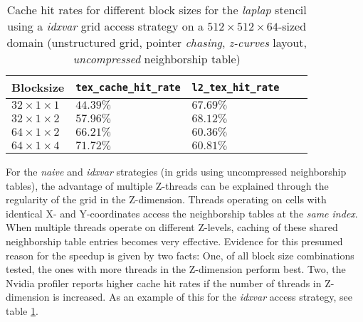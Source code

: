 \begin{table}
	\begin{center}
    \begin{tabular}{l l l p{2cm} p{2cm}}
        \hline
        \textbf{Blocksize} & \textbf{\texttt{tex\_\allowbreak cache\_\allowbreak hit\_\allowbreak rate}} & \textbf{\texttt{l2\_\allowbreak tex\_\allowbreak hit\_\allowbreak rate}} \\
        \hline
        \hline
        $32\times 1\times 1$ & $44.39\%$ & $67.69\%$ \\
        $32\times 1\times 2$ & $57.96\%$ & $68.12\%$ \\
        $64\times 1\times 2$ & $66.21\%$ & $60.36\%$ \\
        $64\times 1\times 4$ & $71.72\%$ & $60.81\%$ \\
        \hline
    \end{tabular}
	\end{center}
    \caption{\label{tab:laplap-blocksize-metrics} Cache hit rates for different block sizes for the \emph{laplap} stencil using a \emph{idxvar} grid access strategy on a $512\times 512\times 64$-sized domain (unstructured grid, pointer \emph{chasing}, \emph{z-curves} layout, \emph{uncompressed} neighborship table)}
\end{table}

For the \emph{naive} and \emph{idxvar} strategies (in grids using uncompressed neighborship tables), the advantage of multiple Z-threads can be explained through the regularity of the grid in the Z-dimension. Threads operating on cells with identical X- and Y-coordinates access the neighborship tables at the \emph{same index}. When multiple threads operate on different Z-levels, caching of these shared neighborship table entries becomes very effective. Evidence for this presumed reason for the speedup is given by two facts: One, of all block size combinations tested, the ones with more threads in the Z-dimension perform best. Two, the Nvidia profiler reports higher cache hit rates if the number of threads in Z-dimension is increased. As an example of this for the \emph{idxvar} access strategy, see table \ref{tab:laplap-blocksize-metrics}.

